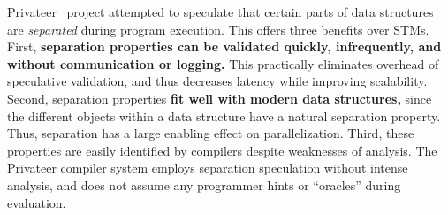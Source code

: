 Privateer~\cite{johnson:12:pldi:short} project attempted to speculate that
certain parts of data structures are {\em separated} during program
execution.  This offers three benefits over STMs.
First, {\bf separation properties can be validated quickly, infrequently,
and without communication or logging.}  This practically eliminates
overhead of speculative validation, and thus decreases latency while
improving scalability.  Second, separation properties {\bf fit well with modern data
structures,} since the different objects within a data structure have a
natural separation property.  Thus, separation has a
large enabling effect on parallelization.  Third,
these properties are easily identified by compilers despite
weaknesses of analysis.  The Privateer compiler system
employs separation speculation without intense analysis, and
does not assume any programmer hints or ``oracles'' during evaluation.





